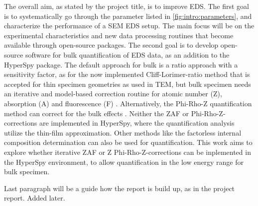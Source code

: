 The overall aim, as stated by the project title, is to improve EDS.
The first goal is to systematically go through the parameter listed in \cref{fig:intro:parameters}, and characterize the performance of a SEM EDS setup.
The main focus will be on the experimental characteristics and new data processing routines that become available through open-source packages.
The second goal is to develop open-source software for bulk quantification of EDS data, as an addition to the HyperSpy package.
The default approach for bulk is a ratio approach with a sensitivity factor, as for the now implemented Cliff-Lorimer-ratio method that is accepted for thin specimen geometries as used in TEM, but bulk specimen needs an iterative and model-based correction routine for atomic number (Z), absorption (A) and fluorescence (F) \cite{goldstein_scanning_2018}.
Alternatively, the Phi-Rho-Z quantification method can correct for the bulk effects .
Neither the ZAF or Phi-Rho-Z-corrections are implemented in HyperSpy, where the quantification analysis utilize the thin-film approximation.
Other methods like the factorless internal composition determination \cite{nilsen_factorless_2021}  can also be used for quantification.
This work aims to explore whether iterative ZAF or Z Phi-Rho-Z-corrections can be inplemented in the HyperSpy environment, to allow quantification in the low energy range for bulk specimen.




Last paragraph will be a guide how the report is build up, as in the project report. Added later.









